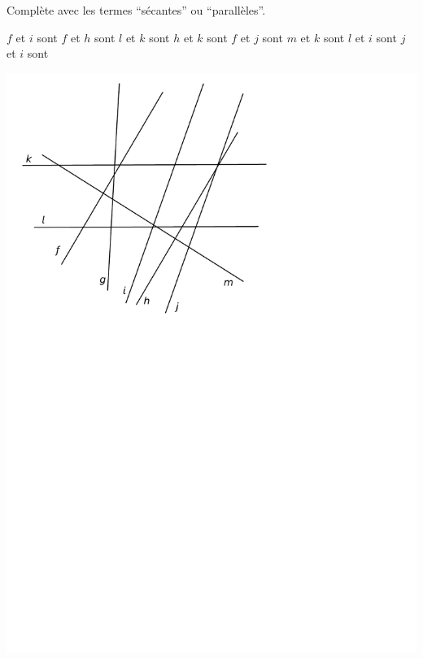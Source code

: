 \documentclass[a4paper,11pt]{report}
\begin{document}
\newpage
\begin{exop}
   {Complète avec les termes ``sécantes'' ou ``parallèles''.

	   \begin{minipage}[t]{0.45\textwidth}{
	   \vspace{0pt}	   
    \begin{tasks}
        \task $f$ et $i$ sont 
        \task $f$ et $h$ sont 
        \task $l$ et $k$ sont 
        \task $h$ et $k$ sont 
        \task $f$ et $j$ sont 
        \task $m$ et $k$ sont 
        \task $l$ et $i$ sont 
        \task $j$ et $i$ sont 
    \end{tasks}
	   }
	   \end{minipage}
	   \hfill
	   \begin{minipage}[t]{0.55\textwidth}{
	   \vspace{0pt}
\begin{center}
	\includegraphics[scale=0.7]{media/es-11/13-6}
\end{center}
	   }

\end{minipage}}
\end{exop}
\end{document}
